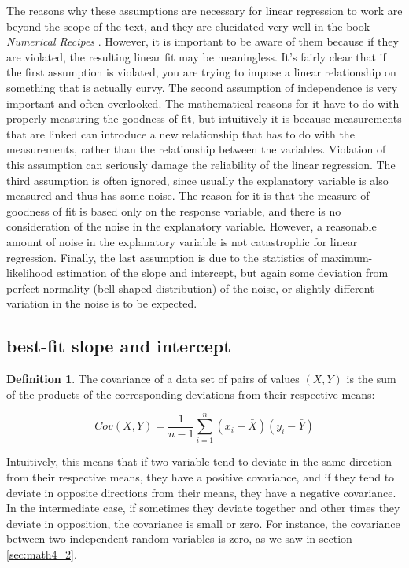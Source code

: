 \documentclass[
]{book}
\theoremstyle{definition}
\newtheorem{definition}{Definition}[chapter]
\theoremstyle{definition}
\theoremstyle{definition}
\theoremstyle{remark}
\begin{document}
The reasons why these assumptions are necessary for linear regression to work are beyond the scope of the text, and they are elucidated very well in the book \emph{Numerical Recipes} \citep{press_numerical_2007}. However, it is important to be aware of them because if they are violated, the resulting linear fit may be meaningless. It's fairly clear that if the first assumption is violated, you are trying to impose a linear relationship on something that is actually curvy. The second assumption of independence is very important and often overlooked. The mathematical reasons for it have to do with properly measuring the goodness of fit, but intuitively it is because measurements that are linked can introduce a new relationship that has to do with the measurements, rather than the relationship between the variables. Violation of this assumption can seriously damage the reliability of the linear regression. The third assumption is often ignored, since usually the explanatory variable is also measured and thus has some noise. The reason for it is that the measure of goodness of fit is based only on the response variable, and there is no consideration of the noise in the explanatory variable. However, a reasonable amount of noise in the explanatory variable is not catastrophic for linear regression. Finally, the last assumption is due to the statistics of maximum-likelihood estimation of the slope and intercept, but again some deviation from perfect normality (bell-shaped distribution) of the noise, or slightly different variation in the noise is to be expected.

\hypertarget{best-fit-slope-and-intercept}{%
\subsection{best-fit slope and intercept}\label{best-fit-slope-and-intercept}}

\begin{definition}
\protect\hypertarget{def:def-cov}{}{\label{def:def-cov} }The  covariance of a data set of pairs of values \((X,Y)\) is the sum of the products of the corresponding deviations from their respective means:
\end{definition}

\[ Cov(X,Y) = \frac{1}{n-1} \sum_{i=1}^n (x_i - \bar X) (y_i - \bar Y) 
\]

Intuitively, this means that if two variable tend to deviate in the same direction from their respective means, they have a positive covariance, and if they tend to deviate in opposite directions from their means, they have a negative covariance. In the intermediate case, if sometimes they deviate together and other times they deviate in opposition, the covariance is small or zero. For instance, the covariance between two independent random variables is zero, as we saw in section \ref{sec:math4_2}.
\end{document}
